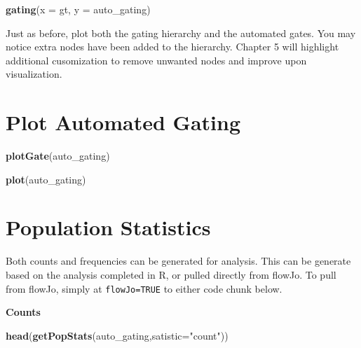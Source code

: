 \documentclass[]{book}
\newenvironment{Shaded}{\begin{snugshade}}{\end{snugshade}}
\newcommand{\DataTypeTok}[1]{\textcolor[rgb]{0.13,0.29,0.53}{#1}}
\newcommand{\KeywordTok}[1]{\textcolor[rgb]{0.13,0.29,0.53}{\textbf{#1}}}
\newcommand{\NormalTok}[1]{#1}
\newcommand{\StringTok}[1]{\textcolor[rgb]{0.31,0.60,0.02}{#1}}
\begin{document}
\begin{Shaded}
\begin{Highlighting}[]
\KeywordTok{gating}\NormalTok{(}\DataTypeTok{x =}\NormalTok{ gt, }\DataTypeTok{y =}\NormalTok{ auto_gating)}
\end{Highlighting}
\end{Shaded}

Just as before, plot both the gating hierarchy and the automated gates. You may notice extra nodes have been added to the hierarchy. Chapter 5 will highlight additional cusomization to remove unwanted nodes and improve upon visualization.

\hypertarget{plot-automated-gating}{%
\section{Plot Automated Gating}\label{plot-automated-gating}}

\begin{Shaded}
\begin{Highlighting}[]
\KeywordTok{plotGate}\NormalTok{(auto_gating)}
\end{Highlighting}
\end{Shaded}

\begin{Shaded}
\begin{Highlighting}[]
\KeywordTok{plot}\NormalTok{(auto_gating)}
\end{Highlighting}
\end{Shaded}

\hypertarget{population-statistics}{%
\section{Population Statistics}\label{population-statistics}}

Both counts and frequencies can be generated for analysis. This can be generate based on the analysis completed in R, or pulled directly from flowJo. To pull from flowJo, simply at \texttt{flowJo=TRUE} to either code chunk below.

\textbf{Counts}

\begin{Shaded}
\begin{Highlighting}[]
\KeywordTok{head}\NormalTok{(}\KeywordTok{getPopStats}\NormalTok{(auto_gating,}\DataTypeTok{satistic=}\StringTok{"count"}\NormalTok{))}
\end{Highlighting}
\end{Shaded}
\end{document}
